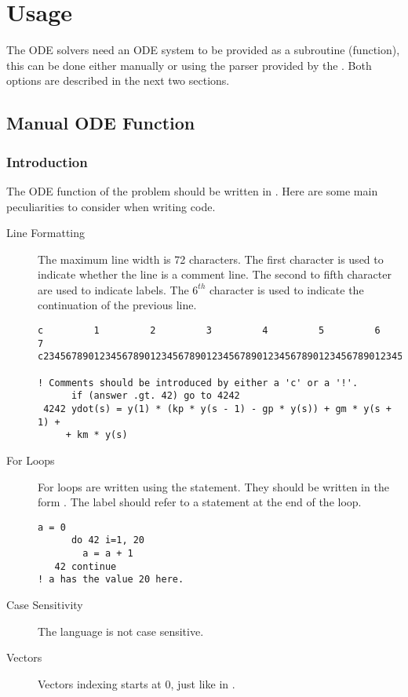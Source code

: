 \chapter{Usage} \label{ch:Usage}
The ODE solvers need an ODE system to be provided as a \Fortran subroutine (function), this can be done either manually or using the parser provided by the \PPODESUITE. Both options are described in the next two sections.
\section{Manual ODE Function}
\subsection{Introduction}
The ODE function of the problem should be written in . Here are some main \Fortran peculiarities to consider when writing \Fortran code.
\begin{description}
 \item[Line Formatting] The maximum line width is 72 characters. The first character is used to indicate whether the line is a comment line. The second to fifth character are used to indicate labels. The $6^{th}$ character is used to indicate the continuation of the previous line.
 \begin{lstlisting}[style=fortrancode,caption=Syntax Example]
c         1         2         3         4         5         6         7
c23456789012345678901234567890123456789012345678901234567890123456789012

! Comments should be introduced by either a 'c' or a '!'.
      if (answer .gt. 42) go to 4242
 4242 ydot(s) = y(1) * (kp * y(s - 1) - gp * y(s)) + gm * y(s + 1) +
     + km * y(s)
 \end{lstlisting}
 \item[For Loops] For loops are written using the  statement. They should be written in the form . The label should refer to a  statement at the end of the loop.
  \begin{lstlisting}[style=fortrancode,caption=Do-Loop]
      a = 0
      do 42 i=1, 20
        a = a + 1
   42 continue
! a has the value 20 here.
 \end{lstlisting}
 \item[Case Sensitivity] The \Fortran language is not case sensitive.
 \item[Vectors] Vectors indexing starts at 0, just like in \MATLAB.
\end{description}


